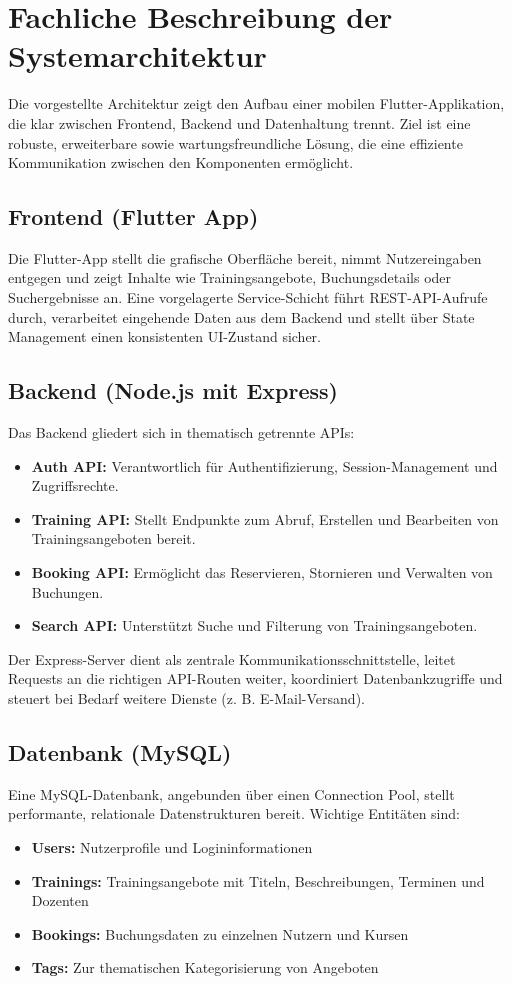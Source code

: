\chapter{Fachliche Beschreibung der Systemarchitektur}

Die vorgestellte Architektur zeigt den Aufbau einer mobilen Flutter-Applikation, die klar zwischen Frontend, Backend und
 Datenhaltung trennt. Ziel ist eine robuste, erweiterbare sowie wartungsfreundliche Lösung, die eine effiziente Kommunikation
  zwischen den Komponenten ermöglicht.

\section{Frontend (Flutter App)}
Die Flutter-App stellt die grafische Oberfläche bereit, nimmt Nutzereingaben entgegen und zeigt Inhalte wie Trainingsangebote, 
Buchungsdetails oder Suchergebnisse an. Eine vorgelagerte Service-Schicht führt REST-API-Aufrufe durch, verarbeitet eingehende
 Daten aus dem Backend und stellt über State Management einen konsistenten UI-Zustand sicher.

\section{Backend (Node.js mit Express)}
Das Backend gliedert sich in thematisch getrennte APIs:
\begin{itemize}
    \item \textbf{Auth API:} Verantwortlich für Authentifizierung, Session-Management und Zugriffsrechte.
    \item \textbf{Training API:} Stellt Endpunkte zum Abruf, Erstellen und Bearbeiten von Trainingsangeboten bereit.
    \item \textbf{Booking API:} Ermöglicht das Reservieren, Stornieren und Verwalten von Buchungen.
    \item \textbf{Search API:} Unterstützt Suche und Filterung von Trainingsangeboten.
\end{itemize}
Der Express-Server dient als zentrale Kommunikationsschnittstelle, leitet Requests an die richtigen API-Routen weiter,
 koordiniert Datenbankzugriffe und steuert bei Bedarf weitere Dienste (z. B. E-Mail-Versand).

\section{Datenbank (MySQL)}
Eine MySQL-Datenbank, angebunden über einen Connection Pool, stellt performante, relationale Datenstrukturen bereit. Wichtige
Entitäten sind:
\begin{itemize}
    \item \textbf{Users:} Nutzerprofile und Logininformationen
    \item \textbf{Trainings:} Trainingsangebote mit Titeln, Beschreibungen, Terminen und Dozenten
    \item \textbf{Bookings:} Buchungsdaten zu einzelnen Nutzern und Kursen
    \item \textbf{Tags:} Zur thematischen Kategorisierung von Angeboten
\end{itemize}

